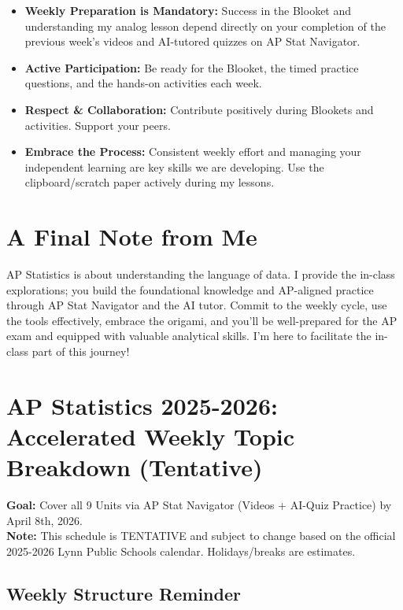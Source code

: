 \documentclass[11pt]{article}
\begin{document}
\begin{itemize}[leftmargin=*]
  \item \textbf{Weekly Preparation is Mandatory:} Success in the Blooket and understanding my analog lesson depend directly on your completion of the previous week's videos and AI-tutored quizzes on AP Stat Navigator.
  
  \item \textbf{Active Participation:} Be ready for the Blooket, the timed practice questions, and the hands-on activities each week.
  
  \item \textbf{Respect \& Collaboration:} Contribute positively during Blookets and activities. Support your peers.
  
  \item \textbf{Embrace the Process:} Consistent weekly effort and managing your independent learning are key skills we are developing. Use the clipboard/scratch paper actively during my lessons.
\end{itemize}

\section{A Final Note from Me}

AP Statistics is about understanding the language of data. I provide the in-class explorations; you build the foundational knowledge and AP-aligned practice through AP Stat Navigator and the AI tutor. Commit to the weekly cycle, use the tools effectively, embrace the origami, and you'll be well-prepared for the AP exam and equipped with valuable analytical skills. I'm here to facilitate the in-class part of this journey!

\section*{\textcolor{lynnmaroon}{AP Statistics 2025-2026: Accelerated Weekly Topic Breakdown (Tentative)}}

\textbf{Goal:} Cover all 9 Units via AP Stat Navigator (Videos + AI-Quiz Practice) by April 8th, 2026.\\
\textbf{Note:} This schedule is TENTATIVE and subject to change based on the official 2025-2026 Lynn Public Schools calendar. Holidays/breaks are estimates.

\subsection*{Weekly Structure Reminder}
\end{document}
